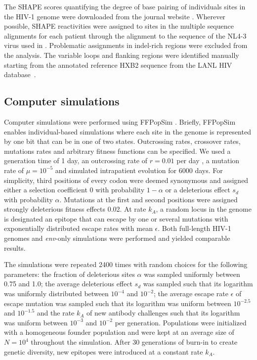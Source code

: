 \documentclass[rmp, twocolumn]{revtex4}
\newcommand{\env}{\textit{env}}
\begin{document}
The SHAPE scores quantifying the degree of base pairing of individuals sites in
the HIV-1 genome were downloaded from the journal website
\citep{watts_architecture_2009}. Wherever possible, SHAPE reactivities were
assigned to sites in the multiple sequence alignments for each patient through
the alignment to the sequence of the NL4-3 virus used in
\citep{watts_architecture_2009}. Problematic assignments in indel-rich
regions were excluded from the analysis. The variable loops and flanking
regions were identified manually starting from the annotated reference HXB2
sequence from the LANL HIV database~\citep{LANL2012}. 

\subsection*{Computer simulations}
Computer simulations were performed using FFPopSim
\citep{zanini_ffpopsim:_2012}. Briefly, FFPopSim enables individual-based
simulations where each site in the genome is represented by one bit that can be
in one of two states. Outcrossing rates, crossover rates, mutations rates and
arbitrary fitness functions can be specified. We used a generation time of 1
day, an outcrossing rate of $r=0.01$ per day \citep{batorsky_estimate_2011,
neher_recombination_2010}, a mutation rate of $\mu=10^{-5}$
\citep{mansky_lower_1995, abram_nature_2010} and simulated intrapatient
evolution for 6000 days. For simplicity, third positions of every codon were
deemed synonymous and assigned either a selection coefficient $0$ with
probability $1-\alpha$ or a deleterious effect $s_d$ with probability $\alpha$.
Mutations at the first and second positions were assigned strongly deleterious 
fitness effects 0.02. At 
rate $k_A$, a random locus in the genome is designated an epitope that can
escape by one or several mutations with exponentially distributed escape rates
with mean $\epsilon$. Both full-length HIV-1 genomes and \env{}-only simulations
were performed and yielded comparable results.

The simulations were repeated 2400 times with random choices for the following
parameters: the fraction of deleterious sites $\alpha$ was sampled uniformly
between 0.75 and 1.0; the average deleterious effect $s_d$ was sampled such that
its logarithm was uniformly distributed  between $10^{-4}$ and $10^{-2}$; the
average escape rate $\epsilon$ of escape mutation was sampled such that its logarithm was
uniform between $10^{-2.5}$ and $10^{-1.5}$ and the rate $k_A$ of new antibody
challenges such that its logarithm was uniform between $10^{-3}$ and $10^{-2}$
per generation. Populations were initialized with a homogeneous founder
population and were kept at an average size of $N=10^4$ throughout the
simulation. After 30 generations of burn-in to create genetic diversity, new
epitopes were introduced at a constant rate $k_A$. 
\end{document}
